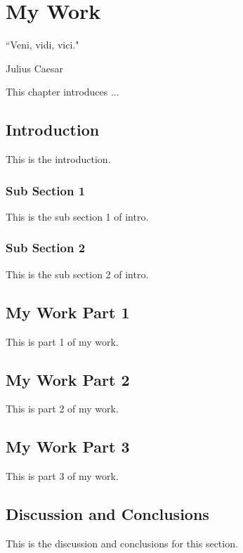 %
%
%



\chapter{My Work}
\label{intro} %

\epigraph{``Veni, vidi, vici."}
{Julius Caesar}

This chapter introduces ...

\section{Introduction}
\label{sec:intro}

This is the introduction.

\subsection{Sub Section 1}
\label{sec:S2SS1}

This is the sub section 1 of intro.

\subsection{Sub Section 2}
\label{sec:S2SS2}

This is the sub section 2 of intro.

\section{My Work Part 1}
\label{sec:p1}

This is part 1 of my work.

\section{My Work Part 2}
\label{sec:p2}

This is part 2 of my work.

\section{My Work Part 3}
\label{sec:p3}

This is part 3 of my work.

\section{Discussion and Conclusions}
\label{section:Discussionconclusion}

This is the discussion and conclusions for this section.